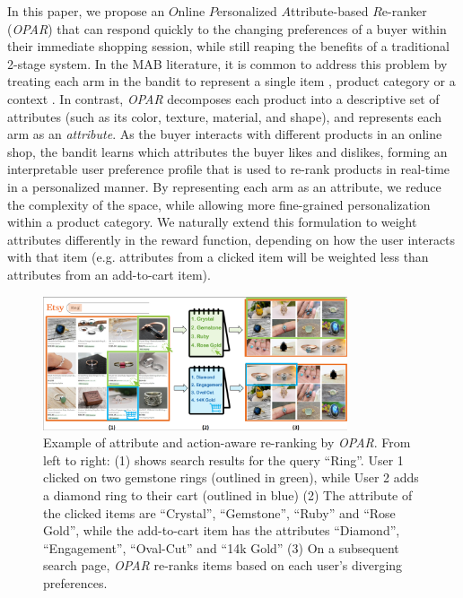 \documentclass[11pt, dvipdfmx]{article}
\begin{document}
In this paper, we propose an $O$nline $P$ersonalized $A$ttribute-based $R$e-ranker (\emph{OPAR}) that can respond quickly to the changing preferences of a buyer within their immediate shopping session, while still reaping the benefits of a traditional 2-stage system. In the MAB literature, it is common to address this problem by treating each arm in the bandit to represent a single item \cite{kdd20_sequentialRec}, product category \cite{recsys16_amazon,MLKD19_JD_onlineRanking} or a context  \cite{KDD18_TaobaoSearch_RL, li2017contextaware,ICML16_contextCascadingBandits}. In contrast, \emph{OPAR} decomposes each product into a descriptive set of attributes (such as its color, texture, material, and shape), and represents each arm as an \emph{attribute}. As the buyer interacts with different products in an online shop, the bandit learns which attributes the buyer likes and dislikes, forming an interpretable user preference profile that is used to re-rank products in real-time in a personalized manner. By representing each arm as an attribute, we reduce the complexity of the space, while allowing more fine-grained personalization within a product category. We naturally extend this formulation to weight attributes differently in the reward function, depending on how the user interacts with that item (e.g. attributes from a clicked item will be weighted less than attributes from an add-to-cart item). 


\begin{figure}[!h]
    \centering
    \includegraphics[width=0.8\textwidth]{submissions/in_session_ranking/figs/fig_toy-cropped_png.png}
    \caption{Example of attribute and action-aware re-ranking by \emph{OPAR}. From left to right: (1) shows search results for the query ``Ring''. User 1 clicked on two gemstone rings (outlined in green), while User 2 adds a diamond ring to their cart (outlined in blue) (2) The attribute of the clicked items are ``Crystal'', ``Gemstone'', ``Ruby'' and ``Rose Gold'', while the add-to-cart item has the attributes ``Diamond'', ``Engagement'', ``Oval-Cut'' and ``14k Gold'' (3) On a subsequent search page, \emph{OPAR} re-ranks items based on each user's diverging preferences.}
\label{fig:toy}
\end{figure}
\end{document}
